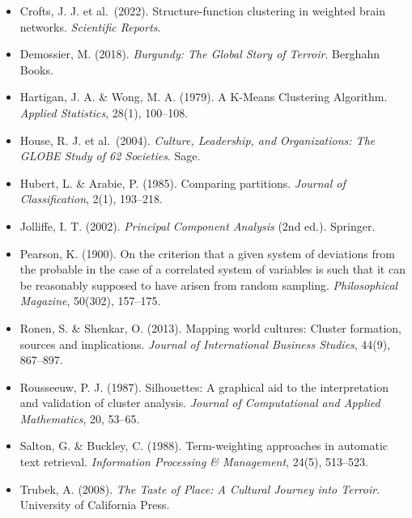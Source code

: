 \documentclass[11pt]{article}
\begin{document}
\begin{itemize}[leftmargin=2em,itemsep=0.2em]
\item Crofts, J. J. et al.\ (2022). Structure-function clustering in weighted brain networks. \emph{Scientific Reports}.
\item Demossier, M. (2018). \emph{Burgundy: The Global Story of Terroir}. Berghahn Books.
\item Hartigan, J. A. \& Wong, M. A. (1979). A K-Means Clustering Algorithm. \emph{Applied Statistics}, 28(1), 100--108.
\item House, R. J. et al.\ (2004). \emph{Culture, Leadership, and Organizations: The GLOBE Study of 62 Societies}. Sage.
\item Hubert, L. \& Arabie, P. (1985). Comparing partitions. \emph{Journal of Classification}, 2(1), 193--218.
\item Jolliffe, I. T. (2002). \emph{Principal Component Analysis} (2nd ed.). Springer.
\item Pearson, K. (1900). On the criterion that a given system of deviations from the probable in the case of a correlated system of variables is such that it can be reasonably supposed to have arisen from random sampling. \emph{Philosophical Magazine}, 50(302), 157--175.
\item Ronen, S. \& Shenkar, O. (2013). Mapping world cultures: Cluster formation, sources and implications. \emph{Journal of International Business Studies}, 44(9), 867--897.
\item Rousseeuw, P. J. (1987). Silhouettes: A graphical aid to the interpretation and validation of cluster analysis. \emph{Journal of Computational and Applied Mathematics}, 20, 53--65.
\item Salton, G. \& Buckley, C. (1988). Term-weighting approaches in automatic text retrieval. \emph{Information Processing \& Management}, 24(5), 513--523.
\item Trubek, A. (2008). \emph{The Taste of Place: A Cultural Journey into Terroir}. University of California Press.
\end{itemize}
\end{document}
